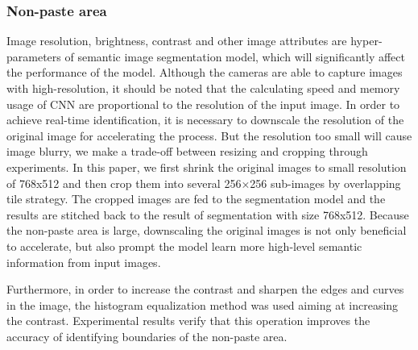 \documentclass[pdflatex,sn-mathphys]{sn-jnl}%
\theoremstyle{thmstyleone}%
\theoremstyle{thmstyletwo}%
\theoremstyle{thmstylethree}%
\begin{document}
\subsubsection{Non-paste area}\label{non-paste-area}
Image resolution, brightness, contrast and other image attributes are hyper-parameters of semantic image segmentation model, which will significantly affect the performance of the model.
Although the cameras are able to capture images with high-resolution, it should be noted that the calculating speed and memory usage of CNN are proportional to the resolution of the input image. 
In order to achieve real-time identification,  it is necessary to downscale the resolution of the original image for accelerating the process. But the resolution too small will cause image blurry, we make a trade-off between resizing and cropping through experiments. 
In this paper, we first shrink the original images to small resolution of 768x512 and then crop them into several 256×256 sub-images by overlapping tile strategy\cite{ronneberger2015u}.
The cropped images are fed to the segmentation model and the results are stitched back to the result of segmentation with size 768x512.
Because the non-paste area is large, downscaling the original images is not only beneficial to accelerate, but also prompt the model learn more high-level semantic information from input images.\par

Furthermore, 
in order to increase the contrast and sharpen the edges and curves in the image, the histogram equalization method was used aiming at increasing the contrast. 
Experimental results verify that this operation improves the accuracy of identifying boundaries of the non-paste area.
\end{document}
